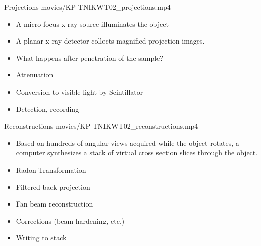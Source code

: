 \documentclass[aspectratio=169,10pt,draft]{beamer}
\begin{document}
\begin{frame}[allowframebreaks]{Projections}
	movies/KP-TNIKWT02\_projections.mp4
	\framebreak%
	\begin{itemize}
		\item A micro-focus x-ray source illuminates the object
		\item A planar x-ray detector collects magnified projection images.		
	\end{itemize}
	\framebreak
	\begin{itemize}
		\item What happens after penetration of the sample?
		\item Attenuation
		\item Conversion to visible light by Scintillator
		\item Detection, recording
	\end{itemize}
\end{frame}

\begin{frame}[allowframebreaks]{Reconstructions}
	movies/KP-TNIKWT02\_reconstructions.mp4
	\framebreak%
	\begin{itemize}
		\item Based on hundreds of angular views acquired while the object rotates, a computer synthesizes a stack of virtual cross section slices through the object.
	\end{itemize}
	\framebreak
	\begin{itemize}
		\item Radon Transformation
		\item Filtered back projection
		\item Fan beam reconstruction
		\item Corrections (beam hardening, etc.)
		\item Writing to stack
	\end{itemize}
\end{frame}
\end{document}
